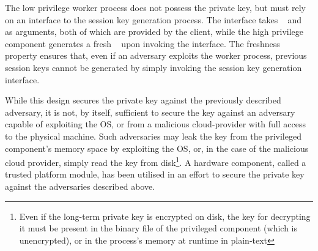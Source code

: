 \documentclass[../main.tex]{subfiles}
\begin{document}
The low privilege worker process does not possess the private key, but
must rely on an interface to the session key generation process. The
interface takes \crandom~ and \premaster~ as arguments, both of which
are provided by the client, while the high privilege component
generates a fresh \srandom~ upon invoking the interface. The freshness
property ensures that, even if an adversary exploits the worker
process, previous session keys cannot be generated by simply invoking
the session key generation interface.

While this design secures the private key against the previously
described adversary, it is not, by itself, sufficient to secure the
key against an adversary capable of exploiting the OS, or from a
malicious cloud-provider with full access to the physical machine.
Such adversaries may leak the key from the privileged component's
memory space by exploiting the OS, or, in the case of the malicious
cloud provider, simply read the key from disk\footnote{Even if the
  long-term private key is encrypted on disk, the key for decrypting
  it must be present in the binary file of the privileged component
  (which is unencrypted), or in the process's memory at runtime in
  plain-text}. A hardware component, called a trusted platform module,
has been utilised in an effort to secure the private key against the
adversaries described above.
\end{document}
